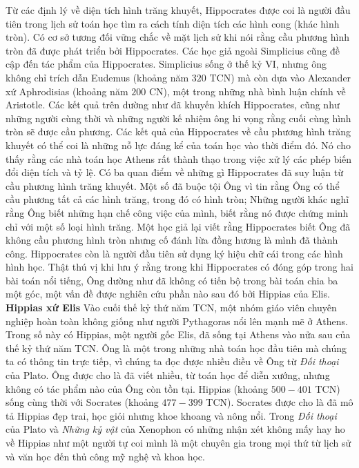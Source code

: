\begin{multicols}{2}
	\vskip 0.1cm
	Từ các định lý về diện tích hình trăng khuyết, Hippocrates được coi là người đầu tiên trong lịch sử toán học tìm ra cách tính diện tích các hình cong (khác hình tròn). 
	\vskip 0.1cm
	Có cơ sở tương đối vững chắc về mặt lịch sử  khi nói rằng cầu phương hình tròn đã được phát triển bởi Hippocrates. Các học giả ngoài Simplicius cũng đề cập đến tác phẩm của Hippocrates. Simplicius sống ở thế kỷ VI, nhưng ông không chỉ trích dẫn Eudemus (khoảng năm $320$ TCN) mà còn dựa vào Alexander xứ Aphrodisias (khoảng năm $200$ CN), một trong những nhà bình luận chính về Aristotle. 
	Các kết quả trên dường như đã khuyến khích Hippocrates, cũng như những người cùng thời và những người kế nhiệm ông hi vọng rằng cuối cùng hình tròn sẽ được cầu phương.
	\vskip 0.1cm
	Các kết quả của Hippocrates về cầu phương hình trăng khuyết có thể coi là những nỗ lực đáng kể của toán học vào thời điểm đó. Nó cho thấy rằng các nhà toán học Athens rất thành thạo trong việc xử lý các phép biến đổi diện tích và tỷ lệ.
	\vskip 0.1cm 
	Có ba quan điểm về những gì Hippocrates đã suy luận từ cầu phương hình trăng khuyết. Một số đã buộc tội Ông vì tin rằng Ông có thể cầu phương tất cả các hình trăng, trong đó có hình tròn; Những người khác nghĩ rằng Ông biết những hạn chế công việc của mình, biết rằng nó được chứng minh chỉ với một số loại hình trăng. Một học giả lại viết rằng Hippocrates biết Ông đã không cầu phương hình tròn nhưng cố đánh lừa đồng hương là mình đã thành công. 
	\vskip 0.1cm
	Hippocrates còn là người đầu tiên sử dụng ký hiệu chữ cái trong các hình hình học. Thật thú vị khi lưu ý rằng trong khi Hippocrates có đóng góp trong hai bài toán nổi tiếng, Ông dường như đã không có tiến bộ trong bài toán chia ba một góc, một vấn đề được nghiên cứu phần nào sau đó bởi Hippias của Elis.
	\vskip 0.1cm
	\textbf{\color{lichsutoanhoc}Hippias xứ Elis}
	\vskip 0.1cm
	Vào cuối thế kỷ thứ năm TCN, một nhóm giáo viên chuyên nghiệp hoàn toàn không giống như người Pythagoras nổi lên mạnh mẽ ở Athens. Trong số này có Hippias, một người gốc Elis, đã sống tại Athens vào nửa sau của thế kỷ thứ năm TCN.  Ông là một trong những nhà toán học đầu tiên mà chúng ta có thông tin trực tiếp, vì chúng ta đọc được nhiều điều về Ông từ \textit{Đối thoại} của Plato. Ông được cho là đã viết nhiều, từ toán học để diễn xướng, nhưng không có tác phẩm nào của Ông còn tồn tại.  
	\vskip 0.1cm
	Hippias (khoảng $500-401$ TCN)  sống cùng thời với Socrates (khoảng $477-399$ TCN). Socrates được cho là đã mô tả Hippias đẹp trai, học giỏi nhưng khoe khoang và nông nổi. Trong \textit{Đối thoại} của Plato và \textit{Những kỷ vật} của Xenophon có những nhận xét không mấy hay ho về Hippias như một người tự coi mình là một chuyên gia trong mọi thứ từ lịch sử và văn học đến thủ công mỹ nghệ và khoa học. 

\end{multicols}
